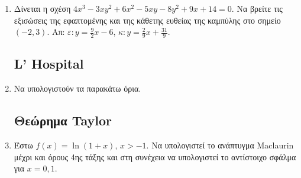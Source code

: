 \begin{enumerate}
    \item Δίνεται η σχέση $ 4x^{3} - 3xy^{2} + 6x^{2} - 5xy - 8 y^{2} + 9x + 14
      = 0$. Να βρείτε τις εξισώσεις της εφαπτομένης και της κάθετης ευθείας
      της καμπύλης στο σημείο $ (-2,3) $.
      \hfill Απ: $\varepsilon\colon y = \frac{9}{2} x - 6 $, 
      $\kappa\colon y = \frac{2}{9} x + \frac{31}{9} $.


      \subsection*{L' Hospital}

    \item Να υπολογιστούν τα παρακάτω όρια.
      \begin{enumerate}[i)]
      \end{enumerate}


\subsection*{Θεώρημα Taylor}

    \item Έστω $ f(x) = \ln{(1+x)} $, $ x>-1 $. Να υπολογιστεί το ανάπτυγμα
      Maclaurin μέχρι και όρους 4ης τάξης και στη συνέχεια να
      υπολογιστεί το αντίστοιχο σφάλμα για $ x = 0,1 $.


\end{enumerate}
